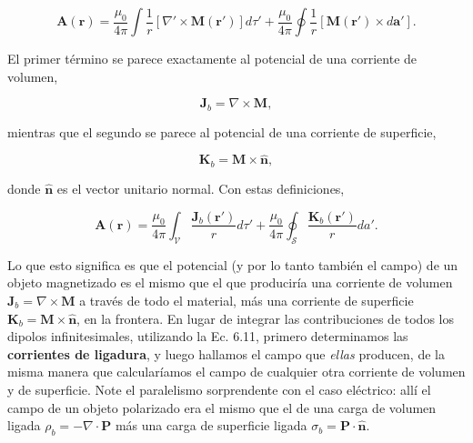 \documentclass[12pt,a4paper]{report}
\newcommand{\esp}{\vspace{0.5cm}}
\begin{document}
	\esp
	
	\begin{equation}
		\mathbf{A}(\mathbf{r}) = \frac{\mu_0}{4\pi} \int \frac{1}{r} [\nabla' \times \mathbf{M}(\mathbf{r}')] d\tau' + \frac{\mu_0}{4\pi} \oint \frac{1}{r} [\mathbf{M}(\mathbf{r}') \times d\mathbf{a}']. \tag{6.12}
	\end{equation}
	
	\esp
	
	El primer término se parece exactamente al potencial de una corriente de volumen,
	
	\esp
	
	\begin{equation}
		\mathbf{J}_b = \nabla \times \mathbf{M}, \tag{6.13}
	\end{equation}
	
	\esp
	
	mientras que el segundo se parece al potencial de una corriente de superficie,
	
	\esp
	
	\begin{equation}
		\mathbf{K}_b = \mathbf{M} \times \hat{\mathbf{n}}, \tag{6.14}
	\end{equation}
	
	\esp
	
	donde $\hat{\mathbf{n}}$ es el vector unitario normal. Con estas definiciones,
	
	\esp
	
	\begin{equation}
		\mathbf{A}(\mathbf{r}) = \frac{\mu_0}{4\pi} \int_{\mathcal{V}} \frac{\mathbf{J}_b(\mathbf{r}')}{r} d\tau' + \frac{\mu_0}{4\pi} \oint_{\mathcal{S}} \frac{\mathbf{K}_b(\mathbf{r}')}{r} da'. \tag{6.15}
	\end{equation}
	
	\esp
	
	Lo que esto significa es que el potencial (y por lo tanto también el campo) de un objeto magnetizado es el mismo que el que produciría una corriente de volumen $\mathbf{J}_b = \nabla \times \mathbf{M}$ a través de todo el material, más una corriente de superficie $\mathbf{K}_b = \mathbf{M} \times \hat{\mathbf{n}}$, en la frontera. En lugar de integrar las contribuciones de todos los dipolos infinitesimales, utilizando la Ec. 6.11, primero determinamos las \textbf{corrientes de ligadura}, y luego hallamos el campo que \textit{ellas} producen, de la misma manera que calcularíamos el campo de cualquier otra corriente de volumen y de superficie. Note el paralelismo sorprendente con el caso eléctrico: allí el campo de un objeto polarizado era el mismo que el de una carga de volumen ligada $\rho_b = -\nabla \cdot \mathbf{P}$ más una carga de superficie ligada $\sigma_b = \mathbf{P} \cdot \hat{\mathbf{n}}$.
	
\end{document}

